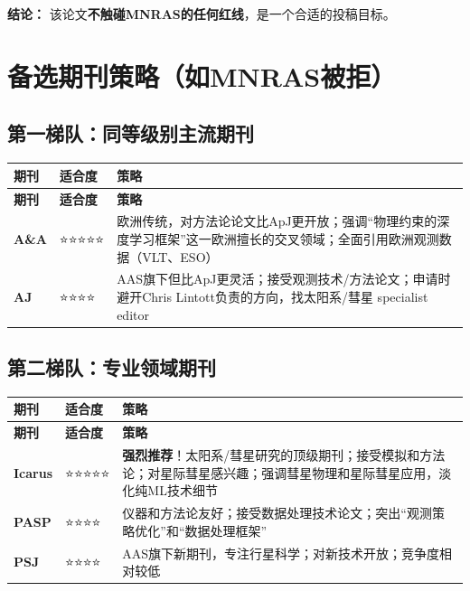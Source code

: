 \documentclass[12pt,a4paper]{article}
\begin{document}
\textbf{结论：} 该论文\textbf{不触碰MNRAS的任何红线}，是一个合适的投稿目标。

\newpage
\section{备选期刊策略（如MNRAS被拒）}

\subsection{第一梯队：同等级别主流期刊}

\begin{center}
\renewcommand{\arraystretch}{1.4}
\begin{longtable}{|p{3cm}|p{2cm}|p{8cm}|}
\hline
\rowcolor{blue!20}
\textbf{期刊} & \textbf{适合度} & \textbf{策略} \\
\hline
\endfirsthead
\hline
\rowcolor{blue!20}
\textbf{期刊} & \textbf{适合度} & \textbf{策略} \\
\hline
\endhead
\textbf{A\&A} & ⭐⭐⭐⭐⭐ & 欧洲传统，对方法论论文比ApJ更开放；强调``物理约束的深度学习框架''这一欧洲擅长的交叉领域；全面引用欧洲观测数据（VLT、ESO） \\
\hline
\textbf{AJ} & ⭐⭐⭐⭐ & AAS旗下但比ApJ更灵活；接受观测技术/方法论文；申请时避开Chris Lintott负责的方向，找太阳系/彗星 specialist editor \\
\hline
\end{longtable}
\end{center}

\subsection{第二梯队：专业领域期刊}

\begin{center}
\renewcommand{\arraystretch}{1.4}
\begin{longtable}{|p{3cm}|p{2cm}|p{8cm}|}
\hline
\rowcolor{green!20}
\textbf{期刊} & \textbf{适合度} & \textbf{策略} \\
\hline
\endfirsthead
\hline
\rowcolor{green!20}
\textbf{期刊} & \textbf{适合度} & \textbf{策略} \\
\hline
\endhead
\textbf{Icarus} & ⭐⭐⭐⭐⭐ & \textbf{强烈推荐}！太阳系/彗星研究的顶级期刊；接受模拟和方法论；对星际彗星感兴趣；强调彗星物理和星际彗星应用，淡化纯ML技术细节 \\
\hline
\textbf{PASP} & ⭐⭐⭐⭐ & 仪器和方法论友好；接受数据处理技术论文；突出``观测策略优化''和``数据处理框架'' \\
\hline
\textbf{PSJ} & ⭐⭐⭐⭐ & AAS旗下新期刊，专注行星科学；对新技术开放；竞争度相对较低 \\
\hline
\end{longtable}
\end{center}
\end{document}
